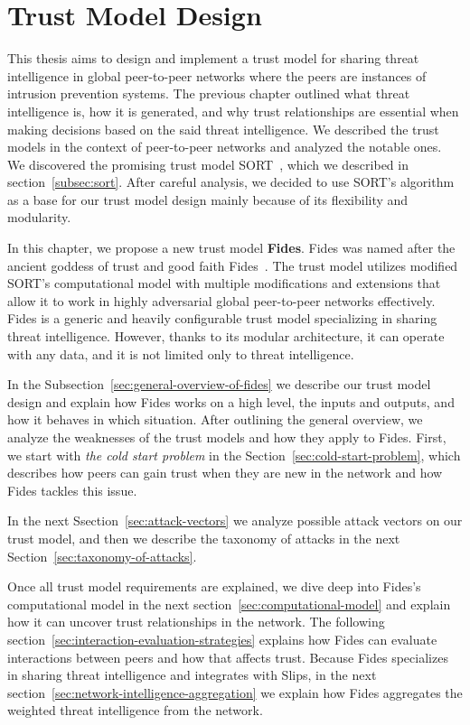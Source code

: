 \chapter{Trust Model Design}
\label{ch:trust-model-design}
This thesis aims to design and implement a trust model for sharing threat intelligence in global peer-to-peer networks where the peers are instances of intrusion prevention systems.
The previous chapter outlined what threat intelligence is, how it is generated, and why trust relationships are essential when making decisions based on the said threat intelligence.
We described the trust models in the context of peer-to-peer networks and analyzed the notable ones.
We discovered the promising trust model SORT~,\cite{sort} which we described in section~\ref{subsec:sort}. After careful analysis, we decided to use SORT's algorithm as a base for our trust model design mainly because of its flexibility and modularity.

In this chapter, we propose a new trust model \textbf{Fides}.
Fides was named after the ancient goddess of trust and good faith Fides~\cite{enwiki:1086924565}.
The trust model utilizes modified SORT's computational model with multiple modifications and extensions that allow it to work in highly adversarial global peer-to-peer networks effectively.
Fides is a generic and heavily configurable trust model specializing in sharing threat intelligence.
However, thanks to its modular architecture, it can operate with any data, and it is not limited only to threat intelligence.

In the Subsection~\ref{sec:general-overview-of-fides} we describe our trust model design and explain how Fides works on a high level, the inputs and outputs, and how it behaves in which situation. After outlining the general overview, we analyze the weaknesses of the trust models and how they apply to Fides.
First, we start with \textit{the cold start problem} in the Section~\ref{sec:cold-start-problem}, which describes how peers can gain trust when they are new in the network and how Fides tackles this issue.

In the next Ssection~\ref{sec:attack-vectors} we analyze possible attack vectors on our trust model, and then we describe the taxonomy of attacks in the next Section~\ref{sec:taxonomy-of-attacks}.

Once all trust model requirements are explained, we dive deep into Fides's computational model in the next section~\ref{sec:computational-model}  and explain how it can uncover trust relationships in the network.
The following section~\ref{sec:interaction-evaluation-strategies} explains how Fides can evaluate interactions between peers and how that affects trust.
Because Fides specializes in sharing threat intelligence and integrates with Slips, in the next section~\ref{sec:network-intelligence-aggregation} we explain how Fides aggregates the weighted threat intelligence from the network.

